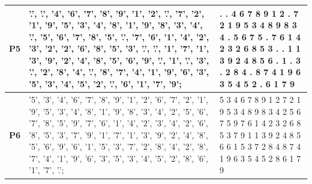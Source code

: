 \documentclass{article}
\begin{document}
\begin{itemize}
\begin{enumerate}
\begin{table}[H]
\begin{tabular}{|c|p{7cm}|p{3cm}|}
    \textbf{P5} & 
        {'.', '.', '4', '6', '7', '8', '9', '1', '2'},\newline
        {'.', '7', '2', '1', '9', '5', '3', '4', '8'},\newline
        {'1', '9', '8', '3', '4', '.', '5', '6', '7'},\newline
        {'8', '5', '.', '7', '6', '1', '4', '2', '3'},\newline
        {'2', '2', '6', '8', '5', '3', '.', '.', '1'},\newline
        {'7', '1', '3', '9', '2', '4', '8', '5', '6'},\newline
        {'9', '.', '1', '.', '3', '.', '2', '8', '4'},\newline
        {'.', '8', '7', '4', '1', '9', '6', '3', '5'},\newline
        {'3', '4', '5', '2', '.', '6', '1', '7', '9'}; & . . 4 6 7 8 9 1 2 \newline
    . 7 2 1 9 5 3 4 8 \newline
    1 9 8 3 4 . 5 6 7 \newline
    8 5 . 7 6 1 4 2 3 \newline
    2 2 6 8 5 3 . . 1 \newline
    7 1 3 9 2 4 8 5 6 \newline
    9 . 1 . 3 . 2 8 4 \newline
    . 8 7 4 1 9 6 3 5 \newline
    3 4 5 2 . 6 1 7 9 \\
    \hline
    \textbf{P6} & 
        {'5', '3', '4', '6', '7', '8', '9', '1', '2'},\newline
        {'6', '7', '2', '1', '9', '5', '3', '4', '8'},\newline
        {'1', '9', '8', '3', '4', '2', '5', '6', '7'},\newline
        {'8', '5', '9', '7', '6', '1', '4', '2', '3'},\newline
        {'4', '2', '6', '8', '5', '3', '7', '9', '1'},\newline
        {'7', '1', '3', '9', '2', '4', '8', '5', '6'},\newline
        {'9', '6', '1', '5', '3', '7', '2', '8', '4'},\newline
        {'2', '8', '7', '4', '1', '9', '6', '3', '5'},\newline
        {'3', '4', '5', '2', '8', '6', '1', '7', '.'}; &5 3 4 6 7 8 9 1 2 \newline
    6 7 2 1 9 5 3 4 8\newline
    1 9 8 3 4 2 5 6 7\newline
    8 5 9 7 6 1 4 2 3\newline
    4 2 6 8 5 3 7 9 1\newline
    7 1 3 9 2 4 8 5 6\newline
    9 6 1 5 3 7 2 8 4\newline
    2 8 7 4 1 9 6 3 5\newline
    3 4 5 2 8 6 1 7 9\\
    \hline
   

\end{tabular}
\end{table}
\end{enumerate}
\end{itemize}
\end{document}
